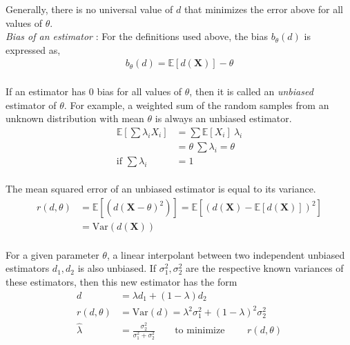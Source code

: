 Generally, there is no universal value of $ d $ that minimizes the error above for all values of $ \theta $. \\


\textit{Bias of an estimator} : For the definitions used above, the bias $ b_{\theta}(d) $ is expressed as, \\

\begin{align}
	b_\theta (d) = \mathbb{E}[d(\textbf{X})] - \theta
\end{align}\\

If an estimator has $ 0 $ bias for all values of $ \theta $, then it is called an \textit{unbiased} estimator of $ \theta $. For example, a weighted sum of the random samples from an unknown distribution with mean $ \theta $ is always an unbiased estimator. \\

\begin{align}
	\mathbb{E}\left[ \sum \lambda_i X_i \right] &= \sum \mathbb{E}[X_i]\ \lambda_i \nonumber \\
	&= \theta\ \sum \lambda_i = \theta \nonumber \\
	\text{if } \sum \lambda_i &= 1
\end{align} \\

The mean squared error of an unbiased estimator is equal to its variance. \\

\begin{align}
	r(d, \theta) &= \mathbb{E}[(d(\textbf{X} - \theta)^2)] = \mathbb{E}[(d(\textbf{X}) - \mathbb{E}[d(\textbf{X})])^2] \nonumber \\
	&= \mathrm{Var}(d(\textbf{X}))
\end{align} \\

For a given parameter $ \theta $, a linear interpolant between two independent unbiased estimators $ d_1, d_2 $ is also unbiased. If $ \sigma_1^2, \sigma_2^2 $ are the respective known variances of these estimators, then this new estimator has the form \\

\begin{align}
	d &= \lambda d_1 + (1-\lambda)d_2 \nonumber \\
	r(d, \theta) &= \mathrm{Var}(d) = \lambda^2 \sigma_1^2 + (1-\lambda)^2 \sigma_2^2 \nonumber \\
	\widehat{\lambda} &= \frac{\sigma_2^2}{\sigma_1^2 + \sigma_2^2} \qquad \text{to minimize } \qquad r(d, \theta)
\end{align} \\


